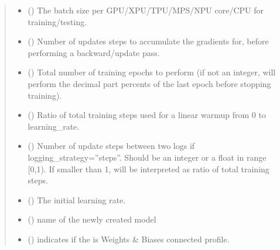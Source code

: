 \documentclass[letterpaper,10pt,english]{sphinxmanual}
\begin{document}
\begin{fulllineitems}
\begin{fulllineitems}
\begin{quote}
\begin{description}
\begin{itemize}
\item {} 
\sphinxAtStartPar
{} () \textendash{} The batch size per GPU/XPU/TPU/MPS/NPU core/CPU for training/testing.

\item {} 
\sphinxAtStartPar
{} () \textendash{} Number of updates steps to accumulate the gradients for, before performing a backward/update pass.

\item {} 
\sphinxAtStartPar
{} () \textendash{} Total number of training epochs to perform (if not an integer, will perform the decimal part percents of the last epoch before stopping training).

\item {} 
\sphinxAtStartPar
{} () \textendash{} Ratio of total training steps used for a linear warmup from 0 to learning\_rate.

\item {} 
\sphinxAtStartPar
{} () \textendash{} Number of update steps between two logs if logging\_strategy=”steps”. Should be an integer or a float in range {[}0,1). If smaller than 1, will be interpreted as ratio of total training steps.

\item {} 
\sphinxAtStartPar
{} () \textendash{} The initial learning rate.

\item {} 
\sphinxAtStartPar
{} () \textendash{} name of the newly created model

\item {} 
\sphinxAtStartPar
{} () \textendash{} indicates if the is Weights \& Biases connected profile.

\end{itemize}


\end{description}
\end{quote}
\end{fulllineitems}
\end{fulllineitems}
\end{document}
